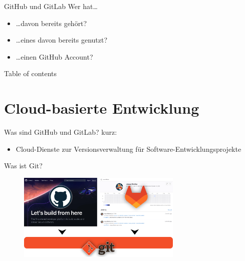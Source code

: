 \documentclass[compress,aspectratio=169]{beamer}
\begin{document}
	\begin{frame}[plain]
		\titlepage
	\end{frame}

	\begin{frame}{GitHub und GitLab}
		Wer hat\ldots
		\begin{itemize}
			\item \ldots davon bereits gehört?
			\item \ldots eines davon bereits genutzt?
			\item \ldots einen GitHub Account?
		\end{itemize}
	\end{frame}

	\begin{frame}[t]{Table of contents}
		\tableofcontents[subsectionstyle=hide/hide]
	\end{frame}


	\section{Cloud-basierte Entwicklung}
		
	\begin{frame}{Was sind GitHub und GitLab?}
		kurz:
		\begin{itemize}
			\item Cloud-Dienste zur Versionsverwaltung für Software-Entwicklungsprojekte
		\end{itemize}
	\end{frame}

	\begin{frame}{Was ist Git?}
		\begin{figure}
			\includegraphics[width=0.7\textwidth]{assets/git-base.png}
		\end{figure}
	\end{frame}
\end{document}
